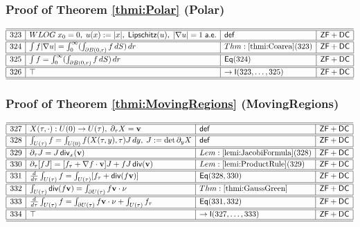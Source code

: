 \documentclass[11pt,reqno]{amsart}
\begin{document}
\medskip

\subsubsection*{Proof of Theorem \ref{thmi:Polar} (\textsf{Polar})}

\noindent$%
\begin{array}{|r|l|l|l|}
\hline\hline
323 & WLOG\;x_{0}=0,\;u(x):=|x|,\;\mathsf{Lipschitz}(u),\;|\nabla u|=1\;\mathsf{a.e.} & \mathsf{def} & \mathsf{ZF+DC} \\ \hline\hline
324 & \int f|\nabla u|=\int_{0}^{\infty}(\int_{\partial B(0,r)}f\,dS)\,dr & Thm:\ref{thmi:Coarea}(323) & \mathsf{ZF+DC} \\ \hline\hline
325 & \int f=\int_{0}^{\infty}(\int_{\partial B(0,r)}f\,dS)\,dr & \mathsf{Eq}(324) & \mathsf{ZF+DC} \\ \hline\hline
326 & \top & \to\mathsf{I}(323,\dots,325) & \mathsf{ZF+DC} \\ \hline\hline
\end{array}%
$

\medskip

\subsubsection*{Proof of Theorem \ref{thmi:MovingRegions} (\textsf{MovingRegions})}

\noindent$%
\begin{array}{|r|l|l|l|}
\hline\hline
327 & X(\tau,\cdot):U(0)\to U(\tau),\;\partial_{\tau}X=\mathbf{v} & \mathsf{def} & \mathsf{ZF+DC} \\ \hline\hline
328 & \int_{U(\tau)}f=\int_{U(0)}f(X(\tau,y),\tau)J\,dy,\;J:=\det\partial_{y}X & \mathsf{def} & \mathsf{ZF+DC} \\ \hline\hline
329 & \partial_{\tau}J=J\,\mathsf{div}_{x}(\mathbf{v}) & Lem:\ref{lemi:JacobiFormula}(328) & \mathsf{ZF+DC} \\ \hline\hline
330 & \partial_{\tau}[fJ]=[f_{\tau}+\nabla f\cdot\mathbf{v}]J+fJ\,\mathsf{div}(\mathbf{v}) & Lem:\ref{lemi:ProductRule}(329) & \mathsf{ZF+DC} \\ \hline\hline
331 & \frac{d}{d\tau}\int_{U(\tau)}f=\int_{U(\tau)}[f_{\tau}+\mathsf{div}(f\mathbf{v})] & \mathsf{Eq}(328,330) & \mathsf{ZF+DC} \\ \hline\hline
332 & \int_{U(\tau)}\mathsf{div}(f\mathbf{v})=\int_{\partial U(\tau)}f\mathbf{v}\cdot\nu & Thm:\ref{thmi:GaussGreen} & \mathsf{ZF+DC} \\ \hline\hline
333 & \frac{d}{d\tau}\int_{U(\tau)}f=\int_{\partial U(\tau)}f\mathbf{v}\cdot\nu+\int_{U(\tau)}f_{\tau} & \mathsf{Eq}(331,332) & \mathsf{ZF+DC} \\ \hline\hline
334 & \top & \to\mathsf{I}(327,\dots,333) & \mathsf{ZF+DC} \\ \hline\hline
\end{array}%
$
\end{document}
